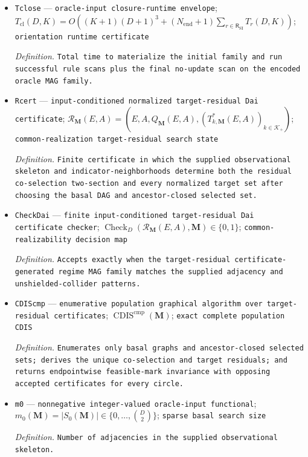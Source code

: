 \documentclass{article}
\begin{document}
\begin{itemize}
  \par\smallskip\noindent\emph{Definition.} Worst-case time for one exhaustive match scan of finitely coded rule \(r\), including cubic-time graph searches for its path premises.
  \item \texttt{Tclose} --- \texttt{oracle-\allowbreak{}input closure-\allowbreak{}runtime envelope}; \(T_{\mathrm{cl}}(D,K)=O((K+1)(D+1)^3+(N_{\mathrm{end}}+1)\sum_{r\in\mathsf R_{\mathrm{SI}}}T_r(D,K))\); \texttt{orientation runtime certificate}
  \par\smallskip\noindent\emph{Definition.} \texttt{Total time to materialize the initial family and run successful rule scans plus the final no-\allowbreak{}update scan on the encoded oracle MAG family.}
  \item \texttt{Rcert} --- \texttt{input-\allowbreak{}conditioned normalized target-\allowbreak{}residual Dai certificate}; \(\mathcal R_{\mathbf M}(E,A)=(E,A,Q_{\mathbf M}(E,A),(T^*_{k,\mathbf M}(E,A))_{k\in\mathcal K_+})\); \texttt{common-\allowbreak{}realization target-\allowbreak{}residual search state}
  \par\smallskip\noindent\emph{Definition.} \texttt{Finite certificate in which the supplied observational skeleton and indicator-\allowbreak{}neighborhoods determine both the residual co-\allowbreak{}selection two-\allowbreak{}section and every normalized target set after choosing the basal DAG and ancestor-\allowbreak{}closed selected set.}
  \item \texttt{CheckDai} --- \texttt{finite input-\allowbreak{}conditioned target-\allowbreak{}residual Dai certificate checker}; \(\operatorname{Check}_{D}(\mathcal R_{\mathbf M}(E,A),\mathbf M)\in\{0,1\}\); \texttt{common-\allowbreak{}realizability decision map}
  \par\smallskip\noindent\emph{Definition.} \texttt{Accepts exactly when the target-\allowbreak{}residual certificate-\allowbreak{}generated regime MAG family matches the supplied adjacency and unshielded-\allowbreak{}collider patterns.}
  \item \texttt{CDIScmp} --- \texttt{enumerative population graphical algorithm over target-\allowbreak{}residual certificates}; \(\operatorname{CDIS}^{\mathrm{cmp}}(\mathbf M)\); \texttt{exact complete population CDIS}
  \par\smallskip\noindent\emph{Definition.} \texttt{Enumerates only basal graphs and ancestor-\allowbreak{}closed selected sets;\allowbreak{} derives the unique co-\allowbreak{}selection and target residuals;\allowbreak{} and returns endpointwise feasible-\allowbreak{}mark invariance with opposing accepted certificates for every circle.}
  \item \texttt{m0} --- \texttt{nonnegative integer-\allowbreak{}valued oracle-\allowbreak{}input functional}; \(m_0(\mathbf M)=|S_0(\mathbf M)|\in\{0,\ldots,\binom D2\}\); \texttt{sparse basal search size}
  \par\smallskip\noindent\emph{Definition.} \texttt{Number of adjacencies in the supplied observational skeleton.}
\end{itemize}
\end{document}
